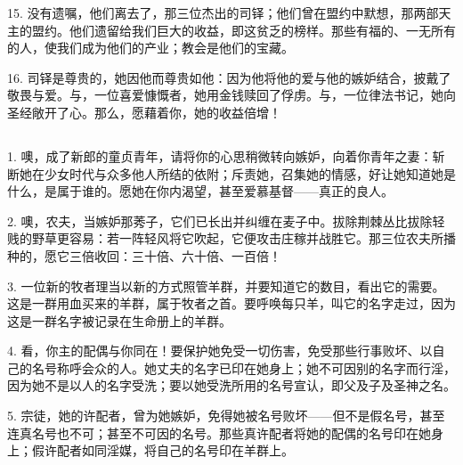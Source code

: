 15. 没有遗嘱，他们离去了，那三位杰出的司铎；他们曾在盟约中默想，那两部天主的盟约。他们遗留给我们巨大的收益，即这贫乏的榜样。那些有福的、一无所有的人，使我们成为他们的产业；教会是他们的宝藏。\par

16. 司铎是尊贵的，她因他而尊贵如他：因为他将他的爱与他的嫉妒结合，披戴了敬畏与爱。与，一位喜爱慷慨者，她用金钱赎回了俘虏。与，一位律法书记，她向圣经敞开了心。那么，愿藉着你，她的收益倍增！\par


\subsection{}

1. 噢，成了新郎的童贞青年，请将你的心思稍微转向嫉妒，向着你青年之妻：斩断她在少女时代与众多他人所结的依附；斥责她，召集她的情感，好让她知道她是什么，是属于谁的。愿她在你内渴望，甚至爱慕基督——真正的良人。\par

2. 噢，农夫，当嫉妒那莠子，它们已长出并纠缠在麦子中。拔除荆棘丛比拔除轻贱的野草更容易：若一阵轻风将它吹起，它便攻击庄稼并战胜它。那三位农夫所播种的，愿它三倍收回：三十倍、六十倍、一百倍！\par

3. 一位新的牧者理当以新的方式照管羊群，并要知道它的数目，看出它的需要。这是一群用血买来的羊群，属于牧者之首。要呼唤每只羊，叫它的名字走过，因为这是一群名字被记录在生命册上的羊群。\par

4. 看，你主的配偶与你同在！要保护她免受一切伤害，免受那些行事败坏、以自己的名号称呼会众的人。她丈夫的名字已印在她身上；她不可因别的名字而行淫，因为她不是以人的名字受洗；要以她受洗所用的名号宣认，即父及子及圣神之名。\par

5. 宗徒，她的许配者，曾为她嫉妒，免得她被名号败坏——但不是假名号，甚至连真名号也不可；甚至不可因的名号。那些真许配者将她的配偶的名号印在她身上；假许配者如同淫媒，将自己的名号印在羊群上。\par

